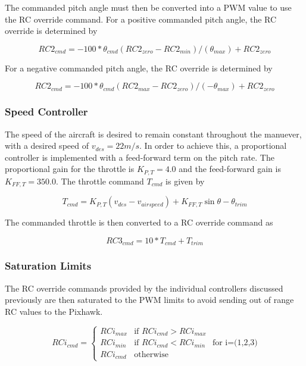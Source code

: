 \documentclass{aiaa}
\begin{document}
The commanded pitch angle must then be converted into a PWM value to use the RC override command. For a positive commanded pitch angle, the RC override is determined by

\begin{equation}
RC2_{cmd} = -100*\theta_{cmd}(RC2_{zero} - RC2_{min})/(\theta_{max}) + RC2_{zero}
\end{equation}

For a negative commanded pitch angle, the RC override is determined by

\begin{equation}
RC2_{cmd} = -100*\theta_{cmd}(RC2_{max} - RC2_{zero})/(-\theta_{max}) + RC2_{zero}
\end{equation}

\subsubsection{Speed Controller}

The speed of the aircraft is desired to remain constant throughout the manuever, with a desired speed of $v_{des} = 22 m/s$. In order to achieve this, a proportional controller is implemented with a feed-forward term on the pitch rate. The proportional gain for the throttle is $K_{P,T} = 4.0$ and the feed-forward gain is $K_{FF,T} = 350.0$. The throttle command $T_{cmd}$ is given by

\begin{equation}
T_{cmd} = K_{P,T}(v_{des} - v_{airspeed}) + K_{FF,T}\sin{\theta - \theta_{trim}}
\end{equation}

The commanded throttle is then converted to a RC override command as

\begin{equation}
RC3_{cmd} = 10*T_{cmd} + T_{trim}
\end{equation}




\subsubsection{Saturation Limits}


The RC override commands provided by the individual controllers discussed previously are then saturated to the PWM limits to avoid sending out of range RC values to the Pixhawk.

\begin{equation}
	RCi_{cmd} = 
	\begin{cases}
		RCi_{max} & \text{if } RCi_{cmd} > RCi_{max}\\
        RCi_{min} & \text{if } RCi_{cmd} < RCi_{min}\\
        RCi_{cmd} & \text{otherwise}
     \end{cases}
     \text{      for i=(1,2,3)}
\end{equation}
\end{document}
